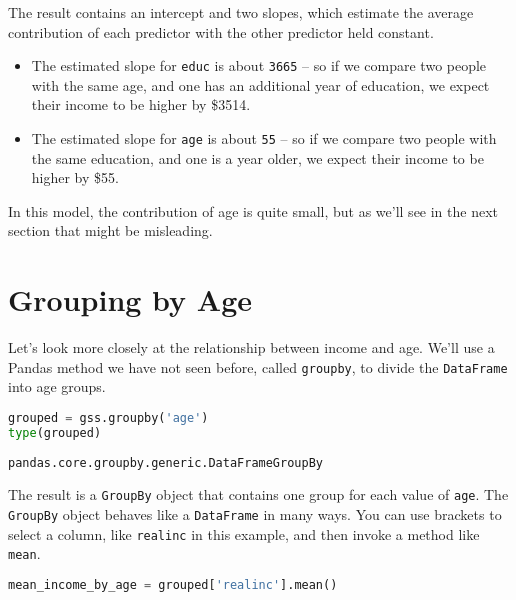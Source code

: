 The result contains an intercept and two slopes, which estimate the
average contribution of each predictor with the other predictor held
constant.

\begin{itemize}
\item
  The estimated slope for \passthrough{\lstinline!educ!} is about
  \passthrough{\lstinline!3665!} -- so if we compare two people with the
  same age, and one has an additional year of education, we expect their
  income to be higher by \$3514.
\item
  The estimated slope for \passthrough{\lstinline!age!} is about
  \passthrough{\lstinline!55!} -- so if we compare two people with the
  same education, and one is a year older, we expect their income to be
  higher by \$55.
\end{itemize}

In this model, the contribution of age is quite small, but as we'll see
in the next section that might be misleading.

\hypertarget{grouping-by-age}{%
\section{Grouping by Age}\label{grouping-by-age}}

Let's look more closely at the relationship between income and age.
We'll use a Pandas method we have not seen before, called
\passthrough{\lstinline!groupby!}, to divide the
\passthrough{\lstinline!DataFrame!} into age groups.

\begin{lstlisting}[language=Python,style=source]
grouped = gss.groupby('age')
type(grouped)
\end{lstlisting}

\begin{lstlisting}[style=output]
pandas.core.groupby.generic.DataFrameGroupBy
\end{lstlisting}

The result is a \passthrough{\lstinline!GroupBy!} object that contains
one group for each value of \passthrough{\lstinline!age!}. The
\passthrough{\lstinline!GroupBy!} object behaves like a
\passthrough{\lstinline!DataFrame!} in many ways. You can use brackets
to select a column, like \passthrough{\lstinline!realinc!} in this
example, and then invoke a method like \passthrough{\lstinline!mean!}.

\begin{lstlisting}[language=Python,style=source]
mean_income_by_age = grouped['realinc'].mean()
\end{lstlisting}

